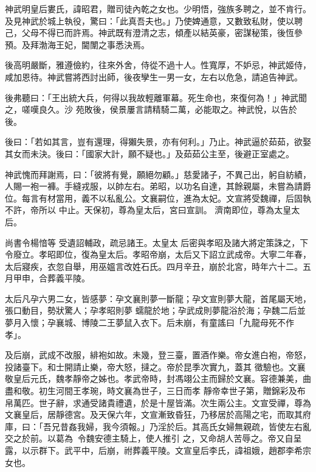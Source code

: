 
\begin{pinyinscope}

 神武明皇后婁氏，諱昭君，贈司徒內乾之女也。少明悟，強族多聘之，並不肯行。及見神武於城上執役，驚曰：「此真吾夫也。」乃使婢通意，又數致私財，使以聘己，父母不得已而許焉。神武既有澄清之志，傾產以結英豪，密謀秘策，後恆參預。及拜渤海王妃，閫闈之事悉決焉。



 後高明嚴斷，雅遵儉約，往來外舍，侍從不過十人。性寬厚，不妒忌，神武姬侍，咸加恩待。神武嘗將西討出師，後夜孿生一男一女，左右以危急，請追告神武。



 後弗聽曰：「王出統大兵，何得以我故輕離軍幕。死生命也，來復何為！」神武聞之，嗟嘆良久。沙
 苑敗後，侯景屢言請精騎二萬，必能取之。神武悅，以告於後。



 後曰：「若如其言，豈有還理，得獺失景，亦有何利。」乃止。神武逼於茹茹，欲娶其女而未決。後曰：「國家大計，願不疑也。」及茹茹公主至，後避正室處之。



 神武愧而拜謝焉，曰：「彼將有覺，願絕勿顧。」慈愛諸子，不異己出，躬自紡績，人賜一袍一褲。手縫戎服，以帥左右。弟昭，以功名自達，其餘親屬，未嘗為請爵位。每言有材當用，義不以私亂公。文襄嗣位，進為太妃。文宣將受魏禪，后固執不許，帝所以
 中止。天保初，尊為皇太后，宮曰宣訓。
 濟南即位，尊為太皇太后。



 尚書令楊愔等
 受遺詔輔政，疏忌諸王。太皇太
 后密與孝昭及諸大將定策誅之，下令廢立。孝昭即位，復為皇太后。孝昭帝崩，太后又下詔立武成帝。大寧二年春，太后寢疾，衣忽自舉，用巫媼言改姓石氏。四月辛丑，崩於北宮，時年六十二。五月甲申，合葬義平陵。



 太后凡孕六男二女，皆感夢：孕文襄則夢一斷龍；孕文宣則夢大龍，首尾屬天地，張口動目，勢狀驚人；孕孝昭則夢
 蠕龍於地；孕武成則夢龍浴於海；孕魏二后並夢月入懷；孕襄城、博陵二王夢鼠入衣下。后未崩，有童謠曰「九龍母死不作孝」。



 及后崩，武成不改服，緋袍如故。未幾，登三臺，置酒作樂。帝女進白袍，帝怒，投諸臺下。和士開請止樂，帝大怒，撻之。帝於昆季次實九，蓋其
 徵驗也。文襄敬皇后元氏，魏孝靜帝之姊也。孝武帝時，封馮翊公主而歸於文襄。容德兼美，曲盡和敬。初生河間王孝琬，時文襄為世子，三日而孝
 靜帝幸世子第，贈錦彩及布帛萬匹。世子辭，求通受諸貴禮遺，於是十屋皆滿。次生兩公主。文宣受禪，尊為文襄皇后，居靜德宮。及天保六年，文宣漸致昏狂，乃移居於高陽之宅，而取其府庫，曰：「吾兄昔姦我婦，我今須報。」乃淫於后。其高氏女婦無親疏，皆使左右亂交之於前。以葛為，令魏安德主騎上，使人推引
 之，又命胡人苦辱之。帝又自呈露，以示群下。武平中，后崩，祔葬義平陵。文宣皇后李氏，諱祖娥，趙郡李希宗女也。




\end{pinyinscope}
